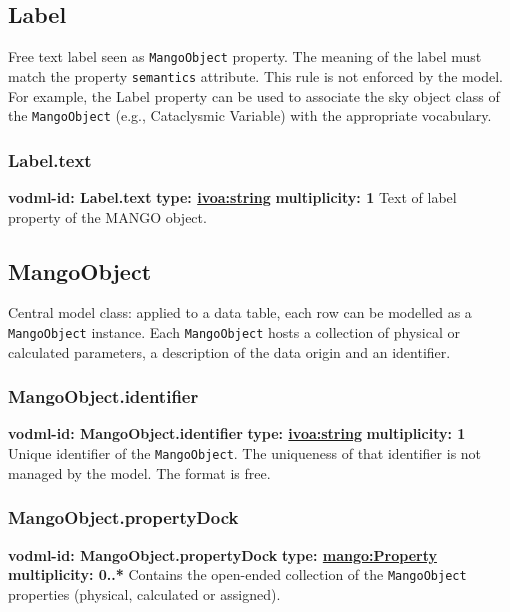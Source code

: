   \subsection{Label}
  \label{sect:Label}
    Free text label seen as \texttt{MangoObject} property. The meaning of the label must match the property \texttt{semantics} attribute. This rule is not enforced by the model. For example, the Label property can be used to associate the sky object class of the \texttt{MangoObject} (e.g., Cataclysmic Variable) with the appropriate vocabulary.

    \subsubsection{Label.text}
      \textbf{vodml-id: Label.text} \newline
      \textbf{type: \hyperref[sect:ivoa]{ivoa:string}} \newline
      \textbf{multiplicity: 1} \newline
      Text of label property of the MANGO object.

  \subsection{MangoObject}
  \label{sect:MangoObject}
    Central model class: applied to a data table, each row can be modelled as a \texttt{MangoObject} instance. Each \texttt{MangoObject} hosts a collection of physical or calculated parameters, a description of the data origin and an identifier.

    \subsubsection{MangoObject.identifier}
      \textbf{vodml-id: MangoObject.identifier} \newline
      \textbf{type: \hyperref[sect:ivoa]{ivoa:string}} \newline
      \textbf{multiplicity: 1} \newline
      Unique identifier of the \texttt{MangoObject}. The uniqueness of that identifier is not managed by the model. The format is free.

    \subsubsection{MangoObject.propertyDock}
      \textbf{vodml-id: MangoObject.propertyDock} \newline
      \textbf{type: \hyperref[sect:Property]{mango:Property}} \newline
      \textbf{multiplicity: 0..*} \newline
      Contains the open-ended collection of the \texttt{MangoObject} properties (physical, calculated or assigned).

